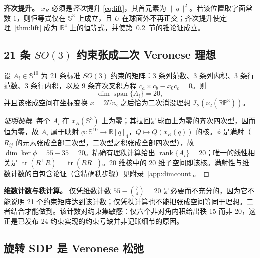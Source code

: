 \textbf{齐次提升。} $x_R$ 必须是\emph{齐次}提升 \eqref{eq:lift}，其首元素为 $\|q\|^2$。若该位置取字面常数 $1$，则恒等式仅在 $\mathbb{S}^3$ 上成立，且 $U$ 在球面外不再正交；齐次提升使定理~\ref{thm:lift} 成为 $\mathbb{R}^4$ 上的恒等式，并使第~\ref{sec:sdp}~节的锥论证成立。

\subsection{21 条 \texorpdfstring{$SO(3)$}{SO(3)} 约束张成二次 Veronese 理想}\label{sec:ideal}

\begin{theorem}\label{thm:ideal}
设 $A_i\in\mathbb{S}^{10}$ 为 21 条标准 $SO(3)$ 约束的矩阵：3 条列范数、3 条列内积、3 条行范数、3 条行内积，以及 9 条齐次叉积方程 $c_a\times c_b-x_0c_c=0$。则
\begin{equation}
\dim\operatorname{span}\{A_i\}=20,
\label{eq:span20}
\end{equation}
并且该张成空间在坐标变换 $x=2Uv_2$ 之后恰为二次消没理想 $\mathcal{I}_2(\nu_2(\mathbb{RP}^3))$。
\end{theorem}

\begin{proof}[证明梗概]
每个 $A_i$ 在 $x_R(\mathbb{S}^3)$ 上为零；其拉回是球面上为零的齐次四次型，因而恒为零，故 $A_i$ 属于映射 $\phi:\mathbb{S}^{10}\to\mathbb{R}[q]_4$，$Q\mapsto Q(x_R(q))$ 的核。$\phi$ 是满射（$R_{ij}$ 的元素张成全部二次型，二次型之积张成全部四次型），故 $\dim\ker\phi=55-35=20$。精确有理秩计算给出 $\operatorname{rank}\{A_i\}=20$；唯一的线性相关是 $\operatorname{tr}(R^\top R)=\operatorname{tr}(RR^\top)$。20 维核中的 20 维子空间即该核。满射性与维数计数的自包含论证（含精确秩步骤）见附录~\ref{app:dimcount}。
\end{proof}

\textbf{维数计数与秩计算。} 仅凭维数计数 $55-\binom74=20$ 是必要而不充分的，因为它不能说明 21 个约束矩阵达到该计数；仅凭秩计算也不能把张成空间等同于理想。二者结合才能做到。该计数对约束集敏感：仅六个非对角内积给出秩 15 而非 20，这正是已发布 24 约束实现的约束亏缺并非记账细节的原因。

\subsection{旋转 SDP 是 Veronese 松弛}\label{sec:sdp}

